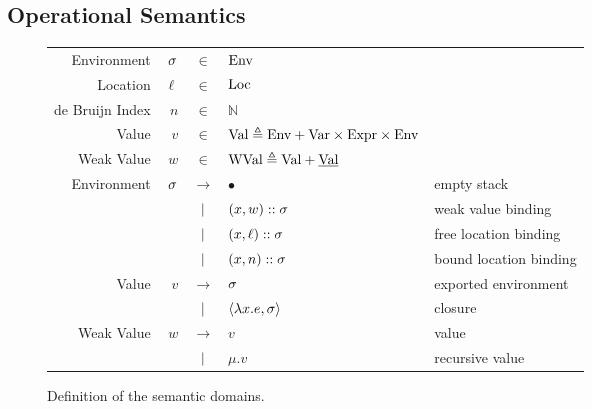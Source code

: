\documentclass{article}
\begin{document}
\subsection{Operational Semantics}
\begin{figure}[h!]
  \centering
  \begin{tabular}{rrcll}
    Environment     & $\sigma$ & $\in$         & $\text{Env}$                                                                         \\
    Location        & $\ell$ & $\in$         & $\text{Loc}$                                                                         \\
    de Bruijn Index & $n$    & $\in$         & $\mathbb{N}$                                                                   \\
    Value           & $v$    & $\in$         & $\text{Val} \triangleq\text{Env}+\text{Var}\times\text{Expr}\times\text{Env}$                          \\
    Weak Value      & $w$    & $\in$         & $\text{WVal}\triangleq\text{Val}+\underline{\text{Val}}$                                      \\
    Environment     & $\sigma$ & $\rightarrow$ & $\bullet$                                             & empty stack            \\
                    &        & $|$       & $(x,w):: \sigma$                                     & weak value binding     \\
                    &        & $|$       & $(x,\ell)::\sigma$                                   & free location binding  \\
                    &        & $|$       & $(x,n)::\sigma$                                      & bound location binding \\
    Value           & $v$    & $\rightarrow$ & $\sigma$                                                & exported environment   \\
                    &        & $|$       & $\langle \lambda x.e, \sigma \rangle$                   & closure                \\
    Weak Value      & $w$    & $\rightarrow$ & $v$                                                   & value                  \\
                    &        & $|$       & $\mu.v$                                               & recursive value
  \end{tabular}
  \caption{Definition of the semantic domains.}
  \label{fig:domain}
\end{figure}
\end{document}
